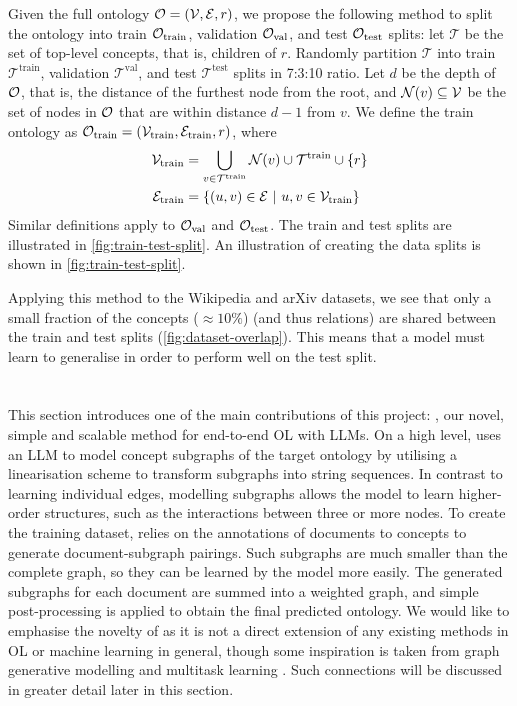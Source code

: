 Given the full ontology $\mathcal{O} = (\mathcal{V}, \mathcal{E}, r)$, we propose the following method to split the ontology into train $\mathcal{O}_{\text{train}}$, validation $\mathcal{O}_{\text{val}}$, and test $\mathcal{O}_{\text{test}}$ splits: let $\mathcal{T}$ be the set of top-level concepts, that is, children of $r$. Randomly partition $\mathcal{T}$ into train $\mathcal{T}^{\text{train}}$, validation $\mathcal{T}^{\text{val}}$, and test $\mathcal{T}^{\text{test}}$ splits in 7:3:10 ratio. Let $d$ be the depth of $\mathcal{O}$, that is, the distance of the furthest node from the root, and $\mathcal{N}(v) \subseteq \mathcal{V}$ be the set of nodes in $\mathcal{O}$ that are within distance $d-1$ from $v$. We define the train ontology as $\mathcal{O}_{\text{train}} = (\mathcal{V}_{\text{train}}, \mathcal{E}_{\text{train}}, r)$, where
\begin{equation*}
    \begin{aligned}
        \mathcal{V}_{\text{train}} & = \bigcup_{v \in \mathcal{T}^{\text{train}}} \mathcal{N}(v) \cup \mathcal{T}^{\text{train}} \cup \{r\} \\
        \mathcal{E}_{\text{train}} & = \{(u, v) \in \mathcal{E}\ |\ u, v \in \mathcal{V}_{\text{train}}\}
    \end{aligned}
\end{equation*}
Similar definitions apply to $\mathcal{O}_{\text{val}}$ and $\mathcal{O}_{\text{test}}$. The train and test splits are illustrated in \cref{fig:train-test-split}. An illustration of creating the data splits is shown in \cref{fig:train-test-split}.


Applying this method to the Wikipedia and arXiv datasets, we see that only a small fraction of the concepts ($\approx 10\%$) (and thus relations) are shared between the train and test splits (\cref{fig:dataset-overlap}). This means that a model must learn to generalise in order to perform well on the test split.


\section{\name}  \label{sec:implementation:core}

This section introduces one of the main contributions of this project: \name, our novel, simple and scalable method for end-to-end OL with LLMs. On a high level, \name uses an LLM to model concept subgraphs of the target ontology by utilising a linearisation scheme to transform subgraphs into string sequences. In contrast to learning individual edges, modelling subgraphs allows the model to learn higher-order structures, such as the interactions between three or more nodes. To create the training dataset, \name relies on the annotations of documents to concepts to generate document-subgraph pairings. Such subgraphs are much smaller than the complete graph, so they can be learned by the model more easily. The generated subgraphs for each document are summed into a weighted graph, and simple post-processing is applied to obtain the final predicted ontology. We would like to emphasise the novelty of \name as it is not a direct extension of any existing methods in OL or machine learning in general, though some inspiration is taken from graph generative modelling \cite{li2018learning} and multitask learning \cite{caruana1997multitask}. Such connections will be discussed in greater detail later in this section.

